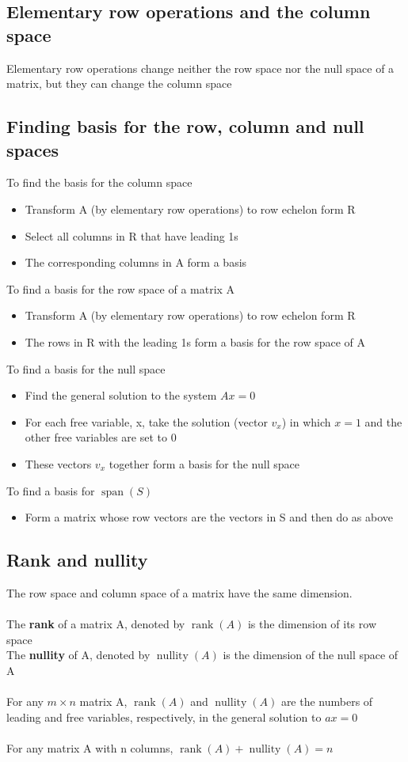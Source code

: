 \documentclass{article}[18pt]
\begin{document}
\subsection{Elementary row operations and the column space}
Elementary row operations change neither the row space nor the null space of a matrix, but they can change the column space
\subsection{Finding basis for the row, column and null spaces}
To find the basis for the column space
\begin{itemize}
	\item Transform A (by elementary row operations) to row echelon form R
	\item Select all columns in R that have leading 1s
	\item The corresponding columns in A form a basis
\end{itemize}
To find a basis for the row space of a matrix A
\begin{itemize}
	\item Transform A (by elementary row operations) to row echelon form R
	\item The rows in R with the leading 1s form a basis for the row space of A
\end{itemize}
To find a basis for the null space
\begin{itemize}
	\item Find the general solution to the system $Ax=0$
	\item For each free variable, x, take the solution (vector $v_x$) in which $x=1$ and the other free variables are set to 0
	\item These vectors $v_x$ together form a basis for the null space
\end{itemize}
To find a basis for $\operatorname{span}(S)$
\begin{itemize}
	\item Form a matrix whose row vectors are the vectors in S and then do as above
\end{itemize}
\subsection{Rank and nullity}
The row space and column space of a matrix have the same dimension.\\
\\
The \textbf{rank} of a matrix A, denoted by $\operatorname{rank}(A)$ is the dimension of its row space\\
The \textbf{nullity} of A, denoted by $\operatorname{nullity}(A)$ is the dimension of the null space of A\\
\\
For any $m\times n$ matrix A, $\operatorname{rank}(A)$ and $\operatorname{nullity}(A)$ are the numbers of leading and free variables, respectively, in the general solution to $ax=0$\\
\\
For any matrix A with n columns, $\operatorname{rank}(A)+\operatorname{nullity}(A)=n$
\end{document}
